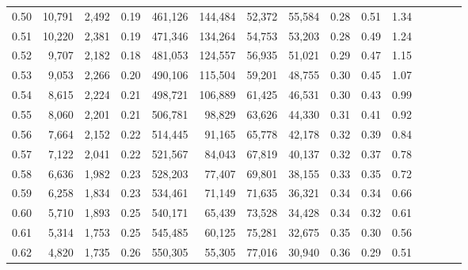 \begin{tabular}{rrrcrrrrrrrrrrr}
0.50 &  10,791 &  2,492 &                                       0.19 &  461,126 &  144,484 &   52,372 &   55,584 &  0.28 &  0.51 &                         1.34 \\
0.51 &  10,220 &  2,381 &                                       0.19 &  471,346 &  134,264 &   54,753 &   53,203 &  0.28 &  0.49 &                         1.24 \\
0.52 &   9,707 &  2,182 &                                       0.18 &  481,053 &  124,557 &   56,935 &   51,021 &  0.29 &  0.47 &                         1.15 \\
0.53 &   9,053 &  2,266 &                                       0.20 &  490,106 &  115,504 &   59,201 &   48,755 &  0.30 &  0.45 &                         1.07 \\
0.54 &   8,615 &  2,224 &                                       0.21 &  498,721 &  106,889 &   61,425 &   46,531 &  0.30 &  0.43 &                         0.99 \\
0.55 &   8,060 &  2,201 &                                       0.21 &  506,781 &   98,829 &   63,626 &   44,330 &  0.31 &  0.41 &                         0.92 \\
0.56 &   7,664 &  2,152 &                                       0.22 &  514,445 &   91,165 &   65,778 &   42,178 &  0.32 &  0.39 &                         0.84 \\
0.57 &   7,122 &  2,041 &                                       0.22 &  521,567 &   84,043 &   67,819 &   40,137 &  0.32 &  0.37 &                         0.78 \\
0.58 &   6,636 &  1,982 &                                       0.23 &  528,203 &   77,407 &   69,801 &   38,155 &  0.33 &  0.35 &                         0.72 \\
0.59 &   6,258 &  1,834 &                                       0.23 &  534,461 &   71,149 &   71,635 &   36,321 &  0.34 &  0.34 &                         0.66 \\
0.60 &   5,710 &  1,893 &                                       0.25 &  540,171 &   65,439 &   73,528 &   34,428 &  0.34 &  0.32 &                         0.61 \\
0.61 &   5,314 &  1,753 &                                       0.25 &  545,485 &   60,125 &   75,281 &   32,675 &  0.35 &  0.30 &                         0.56 \\
0.62 &   4,820 &  1,735 &                                       0.26 &  550,305 &   55,305 &   77,016 &   30,940 &  0.36 &  0.29 &                         0.51 \\

\end{tabular}
